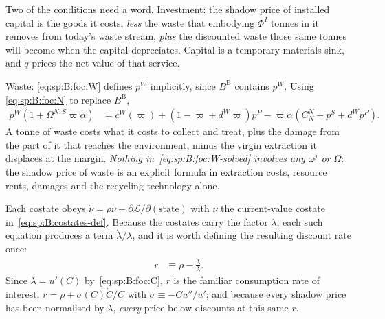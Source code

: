 Two of the conditions need a word. Investment: the shadow price of installed capital is the goods it
costs, \emph{less} the waste that embodying $\Phi^I$ tonnes in it removes from today's waste stream,
\emph{plus} the discounted waste those same tonnes will become when the capital depreciates. Capital
is a temporary materials sink, and $q$ prices the net value of that service.

Waste: \eqref{eq:sp:B:foc:W} defines $p^W$ implicitly, since $B^{\mathrm B}$ contains $p^W$. Using
\eqref{eq:sp:B:foc:N} to replace $B^{\mathrm B}$,
\begin{align}
p^W\left(1+\Omega^{N,S}\varpi\alpha\right)
&= c^W\!\left(\varpi\right)+\left(1-\varpi+d^W\varpi\right)p^P
-\varpi\alpha\left(C^N_N+p^S+d^Wp^P\right).
\label{eq:sp:B:foc:W-solved}
\end{align}
A tonne of waste costs what it costs to collect and treat, plus the damage from the part of it that
reaches the environment, minus the virgin extraction it displaces at the margin. \emph{Nothing
in~\eqref{eq:sp:B:foc:W-solved} involves any $\omega^j$ or $\Omega$}: the shadow price of waste is an
explicit formula in extraction costs, resource rents, damages and the recycling technology alone.

 Each costate obeys $\dot\nu=\rho\nu-\partial\mathcal L/\partial(\text{state})$
with $\nu$ the current-value costate in~\eqref{eq:sp:B:costates-def}. Because the costates carry the
factor $\lambda$, each such equation produces a term $\dot\lambda/\lambda$, and it is worth defining
the resulting discount rate once:
\begin{align}
r &\equiv \rho-\frac{\dot\lambda}{\lambda}.
\label{eq:sp:B:r}
\end{align}
Since $\lambda=u'(C)$ by~\eqref{eq:sp:B:foc:C}, $r$ is the familiar consumption rate of interest,
$r=\rho+\sigma(C)\dot C/C$ with $\sigma\equiv-Cu''/u'$; and because every shadow price has been
normalised by $\lambda$, \emph{every} price below discounts at this same $r$.

